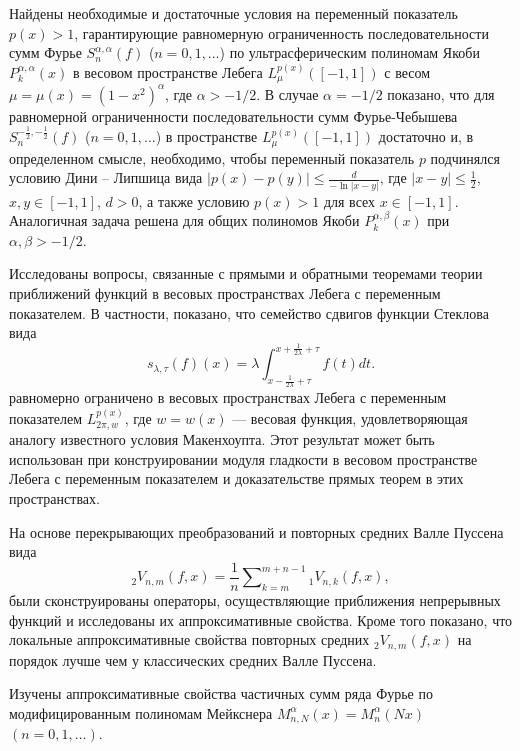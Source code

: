 

Найдены необходимые и достаточные условия на переменный показатель $p(x)>1$, гарантирующие равномерную ограниченность последовательности  сумм Фурье $S_n^{\alpha,\alpha}(f)$ ($n=0,1,\ldots$) по ультрасферическим полиномам Якоби $P_k^{\alpha,\alpha}(x)$
в весовом пространстве Лебега \linebreak$L_\mu^{p(x)}([-1,1])$ с весом $\mu=\mu(x)=(1-x^2)^\alpha$, где $\alpha>-1/2$. В случае $\alpha=-1/2$ показано, что для равномерной ограниченности  последовательности  сумм Фурье-Чебышева $S_n^{-\frac12,-\frac12}(f)$ ($n=0,1,\ldots$) в пространстве $L_\mu^{p(x)}([-1,1])$ достаточно и, в определенном смысле,  необходимо, чтобы переменный показатель $p$ подчинялся условию Дини -- Липшица  вида $|p(x)-p(y)|\le \frac{d}{-\ln|x-y|}$, где $|x-y|\le\frac12$, $x,y\in[-1,1]$, $d>0$, а также условию $p(x)>1$ для всех $x\in[-1,1]$.
Аналогичная задача решена для общих полиномов Якоби $P_k^{\alpha,\beta}(x)$ при $\alpha,\beta>-1/2$.

Исследованы вопросы, связанные с прямыми и обратными теоремами теории приближений функций в весовых пространствах Лебега  с переменным показателем. В частности, показано, что семейство сдвигов функции Стеклова вида
$$s_{\lambda,\tau}(f)(x) = \lambda \int_{x-\frac{1}{2\lambda}+\tau}^{x+\frac{1}{2\lambda}+\tau} f(t)dt.$$
равномерно ограничено в весовых пространствах Лебега с переменным показателем $L_{2\pi, w}^{p(x)}$, где $w = w(x)$ --- весовая функция, удовлетворяющая аналогу известного условия Макенхоупта.
Этот результат может быть использован при конструировании модуля гладкости в весовом пространстве Лебега с переменным показателем и доказательстве прямых теорем в этих пространствах.

На основе перекрывающих преобразований и повторных средних Валле Пуссена вида
 $$
_2V_{n,m}(f,x)= \frac1n\sum\nolimits_{k=m}^{m+n-1}{}_1V_{n,k}(f,x),
$$
были сконструированы операторы, осуществляющие приближения непрерывных функций и исследованы их аппроксимативные свойства. Кроме того показано, что локальные аппроксимативные свойства повторных средних ${}_2V_{n,m}(f,x)$ на порядок лучше чем у классических средних Валле Пуссена.


Изучены аппроксимативные свойства частичных сумм ряда Фурье по модифицированным полиномам Мейкснера $M_{n,N}^\alpha(x)=M_n^\alpha(Nx)$ $(n=0, 1, \dots)$.


